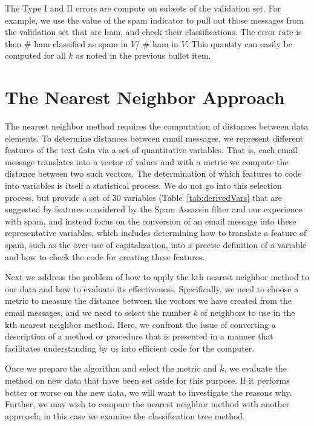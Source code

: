 The Type I and II errors are compute on subsets of the
validation set.
For example, we use the value of the spam indicator 
to pull out those messages from the validation set that are ham,
and check their classifications. The error rate is then
\# ham classified as spam in $V$/ \# ham in $V$.
This quantity can easily be computed for all $k$ as noted in
the previous bullet item.

\section{The Nearest Neighbor Approach}

The nearest neighbor method requires the computation of distances 
between data elements.
To determine distances between email messages, we represent
different features of the text data via a set of quantitative 
variables. That is, each email message translates into a vector 
of values and with a metric we compute the distance between 
two such vectors.
The determination of which features to code into variables 
is itself a statistical process. 
We do not go into this selection process, but provide a set
of 30 variables (Table~\ref{tab:derivedVars}
that are suggested by features considered
by the Spam Assassin filter and our experience with spam,
and instead focus on the conversion of an email message into
these representative variables, which includes determining how to 
translate a feature of spam, such as the over-use of
capitalization, into a precise definition of a variable and
how to check the code for creating these features.

Next we address the problem of how to apply the kth nearest
neighbor method to our data and how to evaluate its effectiveness.
Specifically, we need to choose a metric to measure the distance 
between the vectors we have created from the email messages,
and we need to select the number $k$ of neighbors to use in the kth
nearest neighbor method. 
Here, we confront the issue of converting a description of a method
or procedure that is presented in a manner that facilitates understanding 
by us into efficient code for the computer.

Once we prepare the algorithm and select the metric and $k$,
we evaluate the method on new data that have been set aside for
this purpose. If it performs better or worse on the new data,
we will want to investigate the reasons why.
Further, we may wish to compare the nearest neighbor method with 
another approach, in this case we examine the classification tree 
method. 



